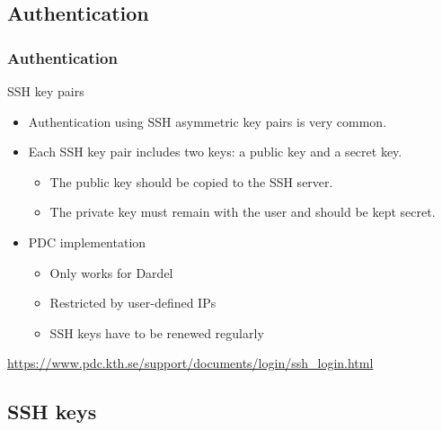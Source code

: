\subsection{Authentication}
\begin{frame}[fragile]
\frametitle{Authentication}
\begin{exampleblock}{\large{SSH key pairs}}
\begin{itemize}
  \item Authentication using SSH asymmetric key pairs is very common.
  \item Each SSH key pair includes two keys: a public key and a secret key.
  \begin{itemize}
    \item The public key should be copied to the SSH server. 
    \item The private key must remain with the user and should be kept secret.
  \end{itemize}
  \item PDC implementation
  \begin{itemize}
    \item Only works for Dardel
    \item Restricted by user-defined IPs
    \item SSH keys have to be renewed regularly
  \end{itemize}
\end{itemize}
\end{exampleblock}

\href{https://www.pdc.kth.se/support/documents/login/ssh\_login.html}{https://www.pdc.kth.se/support/documents/login/ssh\_login.html}

\end{frame}

\subsection*{SSH keys}

